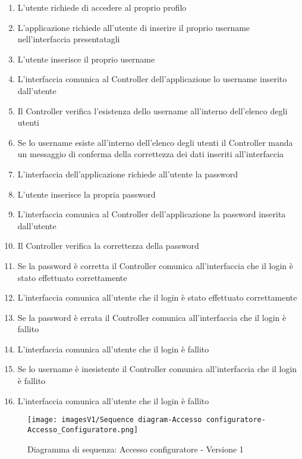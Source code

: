 \begin{enumerate}
    \item L'utente richiede di accedere al proprio profilo
    \item L'applicazione richiede all'utente di inserire il proprio username nell'interfaccia presentatagli
    \item L'utente inserisce il proprio username
    \item L'interfaccia comunica al Controller dell'applicazione lo username inserito dall'utente
    \item Il Controller verifica l'esistenza dello username all'interno dell'elenco degli utenti
    \item Se lo username esiste all'interno dell'elenco degli utenti il Controller manda un messaggio di conferma della correttezza dei dati inseriti all'interfaccia
    \item L'interfaccia dell'applicazione richiede all'utente la password
    \item L'utente inserisce la propria password
    \item L'interfaccia comunica al Controller dell'applicazione la password inserita dall'utente
    \item Il Controller verifica la correttezza della password
    \item Se la password è corretta il Controller comunica all'interfaccia che il login è stato effettuato correttamente
    \item L'interfaccia comunica all'utente che il login è stato effettuato correttamente
    \item Se la password è errata il Controller comunica all'interfaccia che il login è fallito
    \item L'interfaccia comunica all'utente che il login è fallito
    \item Se lo username è inesistente il Controller comunica all'interfaccia che il login è fallito
    \item L'interfaccia comunica all'utente che il login è fallito
\end{enumerate}

\begin{figure}[!]
\centering
\texttt{[image: imagesV1/Sequence diagram-Accesso configuratore-Accesso\_Configuratore.png]}
\caption{\label{fig:Sequence diagram 1.1}Diagramma di sequenza: Accesso configuratore - Versione 1}
\end{figure}\bigskip

